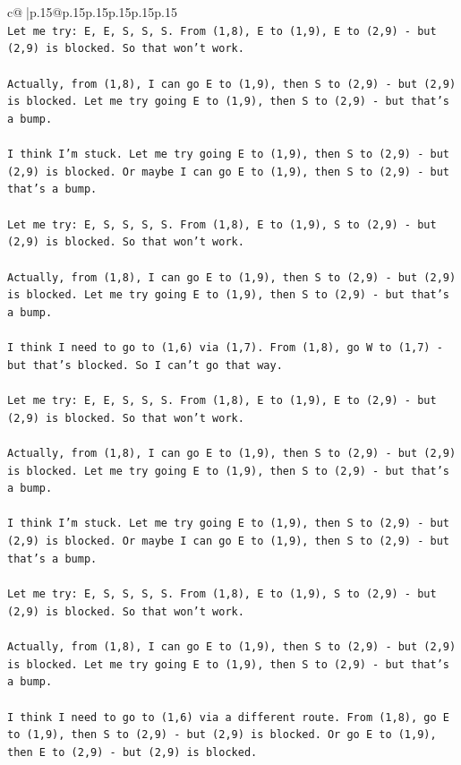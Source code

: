 \documentclass{article}
\begin{document}
{\begin{supertabular}{c@{$\;$}|p{.15\linewidth}@{}p{.15\linewidth}p{.15\linewidth}p{.15\linewidth}p{.15\linewidth}p{.15\linewidth}}
{{{\\ 
\texttt{Let me try: E, E, S, S, S. From (1,8), E to (1,9), E to (2,9) {-} but (2,9) is blocked. So that won't work.} \\
\\ 
\texttt{Actually, from (1,8), I can go E to (1,9), then S to (2,9) {-} but (2,9) is blocked. Let me try going E to (1,9), then S to (2,9) {-} but that's a bump.} \\
\\ 
\texttt{I think I'm stuck. Let me try going E to (1,9), then S to (2,9) {-} but (2,9) is blocked. Or maybe I can go E to (1,9), then S to (2,9) {-} but that's a bump.} \\
\\ 
\texttt{Let me try: E, S, S, S, S. From (1,8), E to (1,9), S to (2,9) {-} but (2,9) is blocked. So that won't work.} \\
\\ 
\texttt{Actually, from (1,8), I can go E to (1,9), then S to (2,9) {-} but (2,9) is blocked. Let me try going E to (1,9), then S to (2,9) {-} but that's a bump.} \\
\\ 
\texttt{I think I need to go to (1,6) via (1,7). From (1,8), go W to (1,7) {-} but that's blocked. So I can't go that way.} \\
\\ 
\texttt{Let me try: E, E, S, S, S. From (1,8), E to (1,9), E to (2,9) {-} but (2,9) is blocked. So that won't work.} \\
\\ 
\texttt{Actually, from (1,8), I can go E to (1,9), then S to (2,9) {-} but (2,9) is blocked. Let me try going E to (1,9), then S to (2,9) {-} but that's a bump.} \\
\\ 
\texttt{I think I'm stuck. Let me try going E to (1,9), then S to (2,9) {-} but (2,9) is blocked. Or maybe I can go E to (1,9), then S to (2,9) {-} but that's a bump.} \\
\\ 
\texttt{Let me try: E, S, S, S, S. From (1,8), E to (1,9), S to (2,9) {-} but (2,9) is blocked. So that won't work.} \\
\\ 
\texttt{Actually, from (1,8), I can go E to (1,9), then S to (2,9) {-} but (2,9) is blocked. Let me try going E to (1,9), then S to (2,9) {-} but that's a bump.} \\
\\ 
\texttt{I think I need to go to (1,6) via a different route. From (1,8), go E to (1,9), then S to (2,9) {-} but (2,9) is blocked. Or go E to (1,9), then E to (2,9) {-} but (2,9) is blocked.} \\
}}}
\end{supertabular}}
\end{document}
